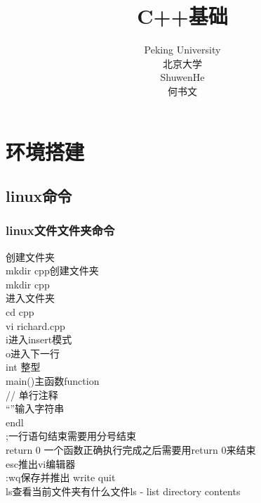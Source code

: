 \documentclass[12pt,twiside,a4paper]{ctexbook}
\numberwithin{chapter}{part}
\begin{document}

\author
{
Peking University\\
北京大学\\
ShuwenHe\\
何书文
}

\title{C++基础}
\maketitle
\tableofcontents
\pagestyle{fancy}


\chapter{环境搭建}
\section{linux命令}
\subsection{linux文件文件夹命令}
创建文件夹\\
mkdir cpp创建文件夹\\
mkdir cpp\\
进入文件夹\\
cd cpp\\
vi richard.cpp\\
i进入insert模式\\
o进入下一行\\
int 整型\\
main()主函数function\\
// 单行注释\\
“”输入字符串\\
endl\\
;一行语句结束需要用分号结束\\
return 0 一个函数正确执行完成之后需要用return 0来结束\\
esc推出vi编辑器\\
:wq保存并推出 write quit\\
ls查看当前文件夹有什么文件ls - list directory contents
\end{document}
